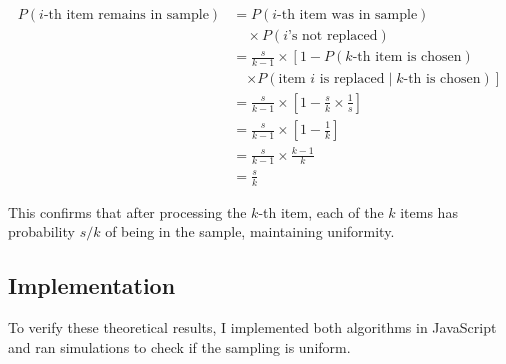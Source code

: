 \documentclass{article}
\begin{document}
\begin{align}
    P(i\text{-th item remains in sample}) &= P(i\text{-th item was in sample}) \nonumber\\
    &\quad \times P(i\text{'s not replaced}) \\
    &= \frac{s}{k-1} \times \left[1 - P(k\text{-th item is chosen}) \right. \nonumber\\
    &\quad \left. \times P(\text{item $i$ is replaced} \mid k\text{-th is chosen})\right] \\
    &= \frac{s}{k-1} \times \left[1 - \frac{s}{k} \times \frac{1}{s}\right] \\
    &= \frac{s}{k-1} \times \left[1 - \frac{1}{k}\right] \\
    &= \frac{s}{k-1} \times \frac{k-1}{k} \\
    &= \frac{s}{k}
\end{align}

This confirms that after processing the $k$-th item, each of the $k$ items has probability $s/k$ of being in the sample, maintaining uniformity.

\subsection{Implementation}

To verify these theoretical results, I implemented both algorithms in JavaScript and ran simulations to check if the sampling is uniform.
\end{document}
